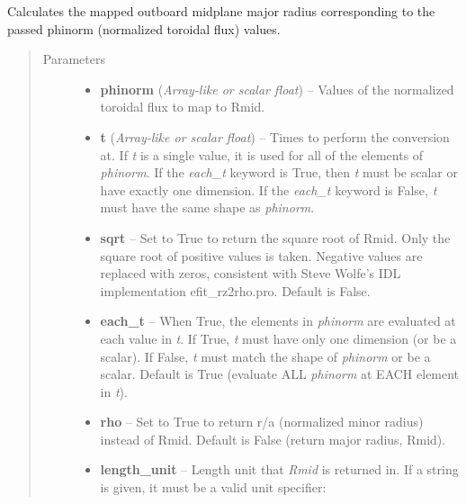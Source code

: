 \documentclass[letterpaper,10pt,english]{sphinxmanual}
\begin{document}
\begin{fulllineitems}
\begin{fulllineitems}
\end{fulllineitems}


\begin{fulllineitems}
\label{eqtools:eqtools.core.Equilibrium.phinorm2rmid}
Calculates the mapped outboard midplane major radius corresponding to the passed phinorm (normalized toroidal flux) values.
\begin{quote}\begin{description}
\item[{Parameters}] \leavevmode\begin{itemize}
\item {} 
\textbf{phinorm} (\emph{Array-like or scalar float}) -- Values of the normalized
toroidal flux to map to Rmid.

\item {} 
\textbf{t} (\emph{Array-like or scalar float}) -- Times to perform the conversion at.
If \emph{t} is a single value, it is used for all of the elements of
\emph{phinorm}. If the \emph{each\_t} keyword is True, then \emph{t} must be scalar
or have exactly one dimension. If the \emph{each\_t} keyword is False,
\emph{t} must have the same shape as \emph{phinorm}.

\item {} 
\textbf{sqrt} -- Set to True to return the square root of Rmid.
Only the square root of positive values is taken. Negative
values are replaced with zeros, consistent with Steve Wolfe's
IDL implementation efit\_rz2rho.pro. Default is False.

\item {} 
\textbf{each\_t} -- When True, the elements in \emph{phinorm} are evaluated
at each value in \emph{t}. If True, \emph{t} must have only one dimension
(or be a scalar). If False, \emph{t} must match the shape of \emph{phinorm}
or be a scalar. Default is True (evaluate ALL \emph{phinorm} at EACH
element in \emph{t}).

\item {} 
\textbf{rho} -- Set to True to return r/a (normalized minor radius)
instead of Rmid. Default is False (return major radius, Rmid).

\item {} 
\textbf{length\_unit} -- 
Length unit that \emph{Rmid} is returned in.
If a string is given, it must be a valid unit specifier:
\begin{quote}


\end{quote}
\end{itemize}
\end{description}
\end{quote}
\end{fulllineitems}
\end{fulllineitems}
\end{document}
